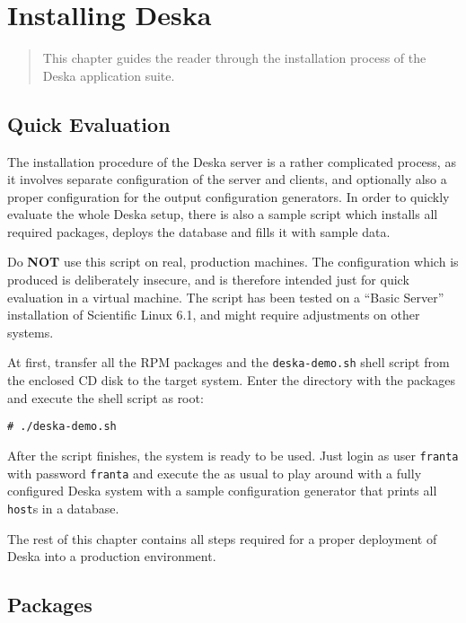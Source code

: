\documentclass[deska]{subfiles}
\begin{document}
\chapter{Installing Deska}
\label{sec:building}

\begin{abstract}
This chapter guides the reader through the installation process of the Deska application suite.
\end{abstract}

\section{Quick Evaluation}

The installation procedure of the Deska server is a rather complicated process, as it involves separate configuration of
the server and clients, and optionally also a proper configuration for the output configuration generators.  In order to
quickly evaluate the whole Deska setup, there is also a sample script which installs all required packages, deploys the
database and fills it with sample data.

Do {\bf NOT} use this script on real, production machines.  The configuration which is produced is deliberately
insecure, and is therefore intended just for quick evaluation in a virtual machine.  The script has been tested on a
``Basic Server'' installation of Scientific Linux 6.1, and might require adjustments on other systems.

At first, transfer all the RPM packages and the {\tt deska-demo.sh} shell script from the enclosed CD disk to the target
system.  Enter the directory with the packages and execute the shell script as root:

\begin{verbatim}
# ./deska-demo.sh
\end{verbatim}

After the script finishes, the system is ready to be used.  Just login as user {\tt franta} with password {\tt franta}
and execute the  as usual to play around with a fully configured Deska system with a sample
configuration generator that prints all {\tt host}s in a database.

The rest of this chapter contains all steps required for a proper deployment of Deska into a production environment.

\section{Packages}
\end{document}
